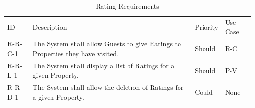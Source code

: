 \begin{table}[H]
    \centering
    \begin{tabular}{| p{1.8cm} | p{9.7cm} | P{1.5cm} | P{2cm} | }
        \hline
          \\ \hline
         ID      & Description & Priority & Use Case \\ \hline
        R-R-C-1 & The System shall allow Guests to give Ratings to Properties they have visited. & Should & R-C \\ \hline
        R-R-L-1 & The System shall display a list of Ratings for a given Property. & Should & P-V \\ \hline
        R-R-D-1 & The System shall allow the deletion of Ratings for a given Property. & Could & None \\ \hline
    \end{tabular}
    \caption{Rating Requirements}
    \label{requirements:ratings}
\end{table}

